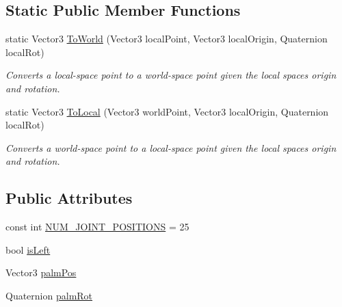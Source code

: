 \subsection*{Static Public Member Functions}
\begin{DoxyCompactItemize}
\item 
static Vector3 \mbox{\hyperlink{class_leap_1_1_unity_1_1_encoding_1_1_vector_hand_aead2e66fb2e278e48b313c30d31c3f6f}{To\+World}} (Vector3 local\+Point, Vector3 local\+Origin, Quaternion local\+Rot)
\begin{DoxyCompactList}\small\item\em Converts a local-\/space point to a world-\/space point given the local space\textquotesingle{}s origin and rotation. \end{DoxyCompactList}\item 
static Vector3 \mbox{\hyperlink{class_leap_1_1_unity_1_1_encoding_1_1_vector_hand_a722895d0b8abc8e2226a4591c3708c7a}{To\+Local}} (Vector3 world\+Point, Vector3 local\+Origin, Quaternion local\+Rot)
\begin{DoxyCompactList}\small\item\em Converts a world-\/space point to a local-\/space point given the local space\textquotesingle{}s origin and rotation. \end{DoxyCompactList}\end{DoxyCompactItemize}
\subsection*{Public Attributes}
\begin{DoxyCompactItemize}
\item 
const int \mbox{\hyperlink{class_leap_1_1_unity_1_1_encoding_1_1_vector_hand_afb1b5d7cec5a6234155fce74756b45bc}{N\+U\+M\+\_\+\+J\+O\+I\+N\+T\+\_\+\+P\+O\+S\+I\+T\+I\+O\+NS}} = 25
\item 
bool \mbox{\hyperlink{class_leap_1_1_unity_1_1_encoding_1_1_vector_hand_a9f9b64bc63a9f3cc55333dd6086d9343}{is\+Left}}
\item 
Vector3 \mbox{\hyperlink{class_leap_1_1_unity_1_1_encoding_1_1_vector_hand_a46a445433c74cf097dcf6b6c3a0699f3}{palm\+Pos}}
\item 
Quaternion \mbox{\hyperlink{class_leap_1_1_unity_1_1_encoding_1_1_vector_hand_ae3c7158f0677bba0daf35a2b1648a046}{palm\+Rot}}
\end{DoxyCompactItemize}
